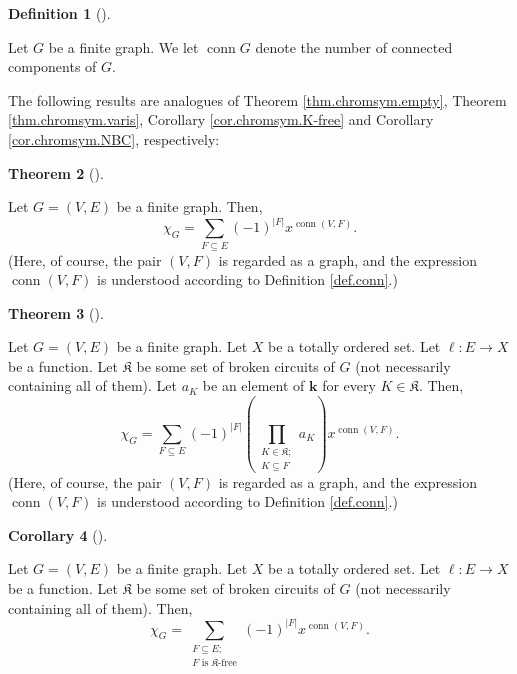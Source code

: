 \documentclass[numbers=enddot,12pt,final,onecolumn,notitlepage]{scrartcl}%
\theoremstyle{definition}
\newtheorem{theo}{Theorem}[section]
\newenvironment{theorem}[1][]
{\begin{theo}[#1]\begin{leftbar}}
{\end{leftbar}\end{theo}}
\newtheorem{defi}[theo]{Definition}
\newenvironment{definition}[1][]
{\begin{defi}[#1]\begin{leftbar}}
{\end{leftbar}\end{defi}}
\newtheorem{coro}[theo]{Corollary}
\newenvironment{corollary}[1][]
{\begin{coro}[#1]\begin{leftbar}}
{\end{leftbar}\end{coro}}
\let\sumnonlimits\sum
\let\prodnonlimits\prod
\renewcommand{\sum}{\sumnonlimits\limits}
\renewcommand{\prod}{\prodnonlimits\limits}
\begin{document}
\begin{definition}
\label{def.conn}Let $G$ be a finite graph. We let $\operatorname*{conn}G$
denote the number of connected components of $G$.
\end{definition}

The following results are analogues of Theorem \ref{thm.chromsym.empty},
Theorem \ref{thm.chromsym.varis}, Corollary \ref{cor.chromsym.K-free} and
Corollary \ref{cor.chromsym.NBC}, respectively:

\begin{theorem}
\label{thm.chrompol.empty}Let $G=\left(  V,E\right)  $ be a finite graph.
Then,%
\[
\chi_{G}=\sum_{F\subseteq E}\left(  -1\right)  ^{\left\vert F\right\vert
}x^{\operatorname*{conn}\left(  V,F\right)  }.
\]
(Here, of course, the pair $\left(  V,F\right)  $ is regarded as a graph, and
the expression $\operatorname*{conn}\left(  V,F\right)  $ is understood
according to Definition \ref{def.conn}.)
\end{theorem}

\begin{theorem}
\label{thm.chrompol.varis}Let $G=\left(  V,E\right)  $ be a finite graph. Let
$X$ be a totally ordered set. Let $\ell:E\rightarrow X$ be a function. Let
$\mathfrak{K}$ be some set of broken circuits of $G$ (not necessarily
containing all of them). Let $a_{K}$ be an element of $\mathbf{k}$ for every
$K\in\mathfrak{K}$. Then,%
\[
\chi_{G}=\sum_{F\subseteq E}\left(  -1\right)  ^{\left\vert F\right\vert
}\left(  \prod_{\substack{K\in\mathfrak{K};\\K\subseteq F}}a_{K}\right)
x^{\operatorname*{conn}\left(  V,F\right)  }.
\]
(Here, of course, the pair $\left(  V,F\right)  $ is regarded as a graph, and
the expression $\operatorname*{conn}\left(  V,F\right)  $ is understood
according to Definition \ref{def.conn}.)
\end{theorem}

\begin{corollary}
\label{cor.chrompol.K-free}Let $G=\left(  V,E\right)  $ be a finite graph. Let
$X$ be a totally ordered set. Let $\ell:E\rightarrow X$ be a function. Let
$\mathfrak{K}$ be some set of broken circuits of $G$ (not necessarily
containing all of them). Then,%
\[
\chi_{G}=\sum_{\substack{F\subseteq E;\\F\text{ is }\mathfrak{K}\text{-free}%
}}\left(  -1\right)  ^{\left\vert F\right\vert }x^{\operatorname*{conn}\left(
V,F\right)  }.
\]

\end{corollary}
\end{document}
